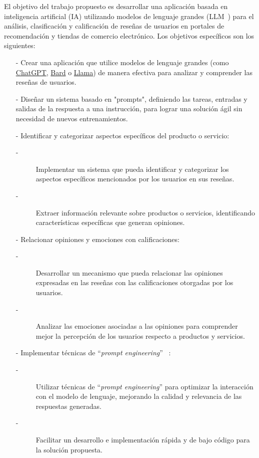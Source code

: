 
El objetivo del trabajo propuesto es desarrollar una aplicación 
basada en inteligencia artificial (IA) utilizando modelos de lenguaje grandes (LLM~\cite{mirchandani2023large}) 
para el análisis, clasificación y calificación de reseñas de usuarios en portales 
de recomendación y tiendas de comercio electrónico. 
Los objetivos específicos son los siguientes:
\begin{itemize}
    \item[-] Crear una aplicación que utilice modelos de lenguaje grandes (como \href{https://chat.openai.com}{ChatGPT}, \href{https://bard.google.com/?hl=es}{Bard} o \href{https://research.facebook.com/publications/llama-open-and-efficient-foundation-language-models}{Llama})
    de manera efectiva para analizar y comprender las reseñas de usuarios. 
    \item[-] Diseñar un sistema basado en "prompts", definiendo las tareas, entradas y 
    salidas de la respuesta a una instrucción, para lograr una solución 
    ágil sin necesidad de nuevos entrenamientos.
    \item[-] Identificar y categorizar aspectos específicos del producto o servicio:
    \begin{description}
        \item[-] Implementar un sistema que pueda identificar y categorizar 
    los aspectos específicos mencionados por los usuarios en sus reseñas.
        \item[-] Extraer información relevante sobre productos o servicios, 
    identificando características específicas que generan opiniones.
    \end{description}
    \item[-] Relacionar opiniones y emociones con calificaciones:
    \begin{description}
        \item[-] Desarrollar un mecanismo que pueda relacionar las opiniones expresadas 
        en las reseñas con las calificaciones otorgadas por los usuarios.
        \item[-] Analizar las emociones asociadas a las opiniones para comprender 
        mejor la percepción de los usuarios respecto a productos y servicios.
    \end{description}
    \item[-] Implementar técnicas de ``\emph{prompt engineering}'' ~\cite{white2023prompt}:
    \begin{description}
        \item[-] Utilizar técnicas de ``\emph{prompt engineering}'' para optimizar la 
        interacción con el modelo de lenguaje, mejorando la calidad y 
        relevancia de las respuestas generadas.
        \item[-] Facilitar un desarrollo e implementación rápida y de bajo código para la solución propuesta. 
    \end{description}
        
\end{itemize}

